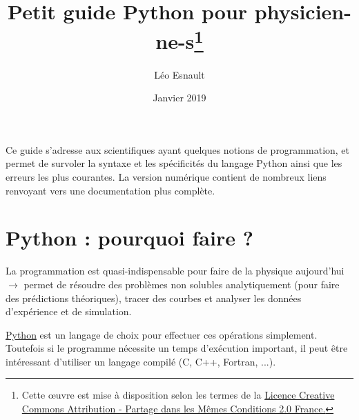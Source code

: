 \documentclass{article}
\title{Petit guide Python pour physicien-ne-s\footnote{Cette œuvre est mise à disposition selon les termes de la \href{http://creativecommons.org/licenses/by-sa/2.0/fr/}{Licence Creative Commons Attribution -  Partage dans les Mêmes Conditions 2.0 France.}}}
\author{Léo Esnault}
\date{Janvier 2019}
\begin{document}
\maketitle

Ce guide s'adresse aux scientifiques ayant quelques notions de programmation, et permet de survoler la syntaxe et les spécificités du langage Python ainsi que les erreurs les plus courantes. La version numérique contient de nombreux liens renvoyant vers une documentation plus complète.

\section{Python : pourquoi faire ?}
La programmation est quasi-indispensable pour faire de la physique aujourd'hui $\to$ permet de résoudre des problèmes non solubles analytiquement (pour faire des prédictions théoriques), tracer des courbes et analyser les données d'expérience et de simulation.

\href{https://fr.wikipedia.org/wiki/Python_(langage)}{Python} est un langage de choix pour effectuer ces opérations simplement. Toutefois si le programme nécessite un temps d'exécution important, il peut être intéressant d'utiliser un langage compilé (C, C++, Fortran, ...).
\end{document}

